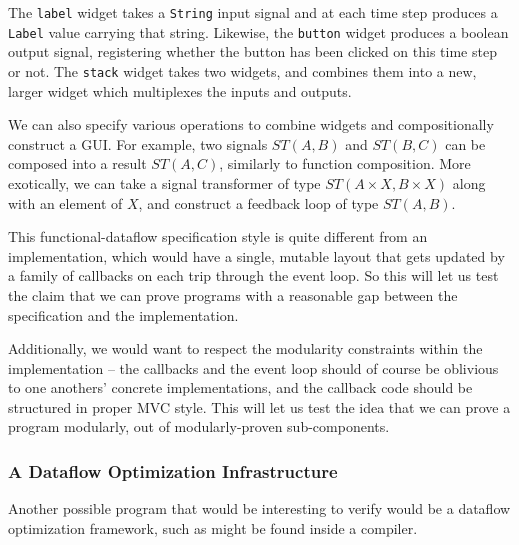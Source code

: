 The \texttt{label} widget takes a \texttt{String} input signal and at
each time step produces a \texttt{Label} value carrying that string.
Likewise, the \texttt{button} widget produces a boolean output signal,
registering whether the button has been clicked on this time step or
not. The \texttt{stack} widget takes two widgets, and combines them into
a new, larger widget which multiplexes the inputs and outputs. 

We can also specify various operations to combine widgets and
compositionally construct a GUI. For example, two signals $ST(A,B)$
and $ST(B, C)$ can be composed into a result $ST(A, C)$, similarly to
function composition. More exotically, we can take a signal
transformer of type $ST(A \times X, B \times X)$ along with an element
of $X$, and construct a feedback loop of type $ST(A,B)$.

This functional-dataflow specification style is quite different from
an implementation, which would have a single, mutable layout that gets
updated by a family of callbacks on each trip through the event loop.
So this will let us test the claim that we can prove programs with a
reasonable gap between the specification and the implementation.

Additionally, we would want to respect the modularity constraints
within the implementation -- the callbacks and the event loop should
of course be oblivious to one anothers' concrete implementations, and
the callback code should be structured in proper MVC style. This will
let us test the idea that we can prove a program modularly, out of 
modularly-proven sub-components. 

\subsubsection{A Dataflow Optimization Infrastructure}

Another possible program that would be interesting to verify would be
a dataflow optimization framework, such as might be found inside a
compiler.

